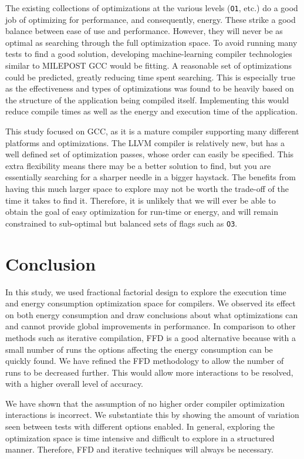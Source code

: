 \documentclass[twocolumn]{article}
\begin{document}
The existing collections of optimizations at the various levels (\texttt{O1}, etc.) do a good job of optimizing for performance, and consequently, energy. These strike a good balance between ease of use and performance. However, they will never be as optimal as searching through the full optimization space. To avoid running many tests to find a good solution, developing machine-learning compiler technologies similar to MILEPOST GCC would be fitting. A reasonable set of optimizations could be predicted, greatly reducing time spent searching. This is especially true as the effectiveness and types of optimizations was found to be heavily based on the structure of the application being compiled itself. Implementing this would reduce compile times as well as the energy and execution time of the application.

This study focused on GCC, as it is a mature compiler supporting many different platforms and optimizations. The LLVM compiler is relatively new, but has a well defined set of optimization passes, whose order can easily be specified. This extra flexibility means there may be a better solution to find, but you are essentially searching for a sharper needle in a bigger haystack. The benefits from having this much larger space to explore may not be worth the trade-off of the time it takes to find it. Therefore, it is unlikely that we will ever be able to obtain the goal of easy optimization for run-time or energy, and will remain constrained to sub-optimal but balanced sets of flags such as \texttt{O3}.

\section{Conclusion}

In this study, we used fractional factorial design to explore the execution time and energy consumption optimization space for compilers. We observed its effect on both energy consumption and draw conclusions about what optimizations can and cannot provide global improvements in performance. In comparison to other methods such as iterative compilation, FFD is a good alternative because with a small number of runs the options affecting the energy consumption can be quickly found. We have refined the FFD methodology to allow the number of runs to be decreased further. This would allow more interactions to be resolved, with a higher overall level of accuracy.

We have shown that the assumption of no higher order compiler optimization interactions is incorrect. We substantiate this by showing the amount of variation seen between tests with different options enabled. In general, exploring the optimization space is time intensive and difficult to explore in a structured manner. Therefore, FFD and iterative techniques will always be necessary.
\end{document}
